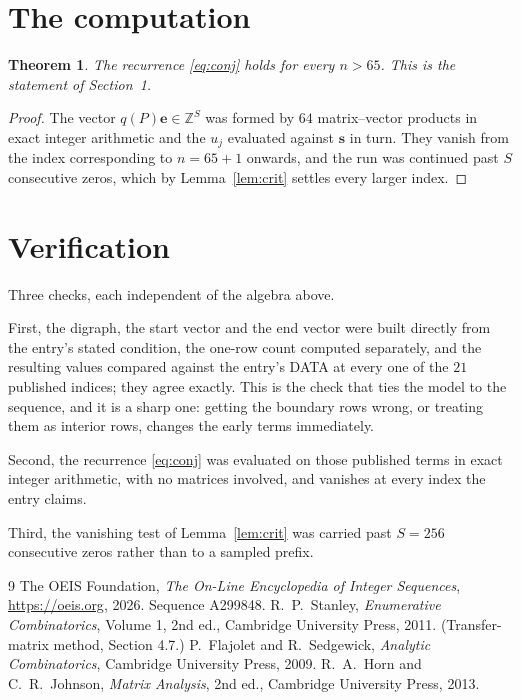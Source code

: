 \documentclass[11pt,a4paper]{article}
\theoremstyle{plain}
\newtheorem{theorem}{Theorem}
\theoremstyle{definition}
\begin{document}
\section{The computation}

\begin{theorem}
The recurrence \eqref{eq:conj} holds for every $n>65$. This is the statement of
Section~1.
\end{theorem}

\begin{proof}
The vector $q(P)\mathbf{e}\in\mathbb{Z}^{S}$ was formed by $64$ matrix--vector
products in exact integer arithmetic and the $u_j$ evaluated against $\mathbf{s}$ in turn.
They vanish from the index corresponding to $n=65+1$ onwards, and the run was continued
past $S$ consecutive zeros, which by Lemma~\ref{lem:crit} settles every larger index.
\end{proof}

\section{Verification}

Three checks, each independent of the algebra above.

First, the digraph, the start vector and the end vector were built directly from the
entry's stated condition, the one-row count computed separately, and the resulting values
compared against the entry's DATA at every one of the $21$ published indices; they
agree exactly. This is the check that ties the model to the sequence, and it is a sharp one:
getting the boundary rows wrong, or treating them as interior rows, changes the early terms
immediately.

Second, the recurrence \eqref{eq:conj} was evaluated on those published terms in exact
integer arithmetic, with no matrices involved, and vanishes at every index the entry claims.

Third, the vanishing test of Lemma~\ref{lem:crit} was carried past $S=256$ consecutive
zeros rather than to a sampled prefix.

\begin{thebibliography}{9}
 The OEIS Foundation, \emph{The On-Line Encyclopedia of Integer
Sequences}, \url{https://oeis.org}, 2026. Sequence A299848.
 R.~P.~Stanley, \emph{Enumerative Combinatorics}, Volume 1, 2nd ed.,
Cambridge University Press, 2011. (Transfer-matrix method, Section 4.7.)
 P.~Flajolet and R.~Sedgewick, \emph{Analytic Combinatorics}, Cambridge
University Press, 2009.
 R.~A.~Horn and C.~R.~Johnson, \emph{Matrix Analysis}, 2nd ed., Cambridge
University Press, 2013.
\end{thebibliography}
\end{document}

